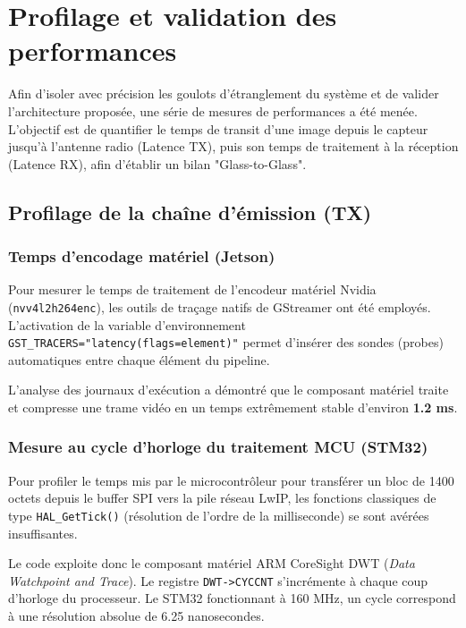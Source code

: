 \section{Profilage et validation des performances}

Afin d'isoler avec précision les goulots d'étranglement du système et de valider l'architecture proposée, une 
série de mesures de performances a été menée. L'objectif est de quantifier le temps de transit d'une image 
depuis le capteur jusqu'à l'antenne radio (Latence TX), puis son temps de traitement à la réception 
(Latence RX), afin d'établir un bilan "Glass-to-Glass".

\subsection{Profilage de la chaîne d'émission (TX)}

\subsubsection{Temps d'encodage matériel (Jetson)}
Pour mesurer le temps de traitement de l'encodeur matériel Nvidia (\texttt{nvv4l2h264enc}), les outils de 
traçage natifs de GStreamer ont été employés. L'activation de la variable d'environnement 
\texttt{GST\_TRACERS="latency(flags=element)"} permet d'insérer des sondes (probes) automatiques entre chaque 
élément du pipeline. 

L'analyse des journaux d'exécution a démontré que le composant matériel traite et compresse une trame vidéo 
en un temps extrêmement stable d'environ \textbf{1.2 ms}.

\subsubsection{Mesure au cycle d'horloge du traitement MCU (STM32)}
Pour profiler le temps mis par le microcontrôleur pour transférer un bloc de 1400 octets depuis le buffer 
SPI vers la pile réseau LwIP, les fonctions classiques de type \texttt{HAL\_GetTick()} 
(résolution de l'ordre de la milliseconde) se sont avérées insuffisantes. 

Le code exploite donc le composant matériel ARM CoreSight DWT (\textit{Data Watchpoint and Trace}). 
Le registre \texttt{DWT->CYCCNT} s'incrémente à chaque coup d'horloge du processeur. Le STM32 fonctionnant à 
160 MHz, un cycle correspond à une résolution absolue de 6.25 nanosecondes.

